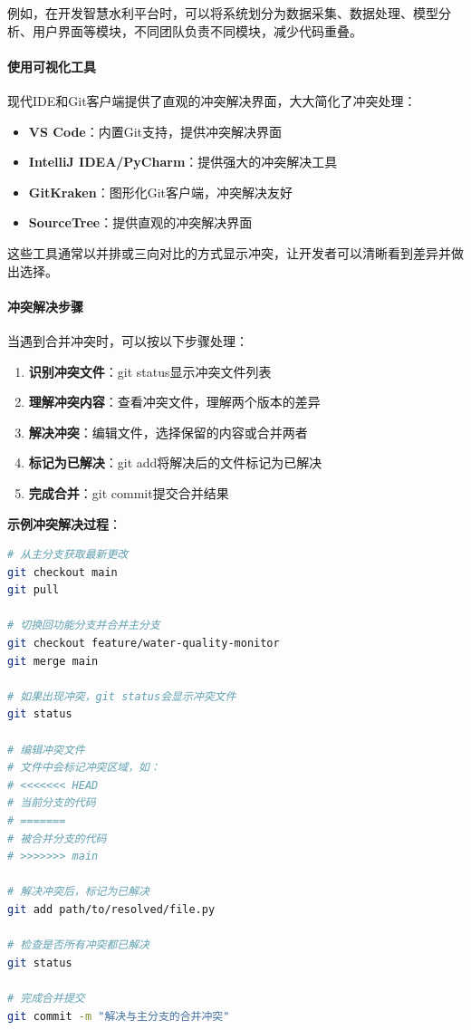 例如，在开发智慧水利平台时，可以将系统划分为数据采集、数据处理、模型分析、用户界面等模块，不同团队负责不同模块，减少代码重叠。

\paragraph{使用可视化工具}\label{ux4f7fux7528ux53efux89c6ux5316ux5de5ux5177}

现代IDE和Git客户端提供了直观的冲突解决界面，大大简化了冲突处理：

\begin{itemize}
\tightlist
\item
  \textbf{VS Code}：内置Git支持，提供冲突解决界面
\item
  \textbf{IntelliJ IDEA/PyCharm}：提供强大的冲突解决工具
\item
  \textbf{GitKraken}：图形化Git客户端，冲突解决友好
\item
  \textbf{SourceTree}：提供直观的冲突解决界面
\end{itemize}

这些工具通常以并排或三向对比的方式显示冲突，让开发者可以清晰看到差异并做出选择。

\paragraph{冲突解决步骤}\label{ux51b2ux7a81ux89e3ux51b3ux6b65ux9aa4}

当遇到合并冲突时，可以按以下步骤处理：

\begin{enumerate}
\def\labelenumi{\arabic{enumi}.}
\tightlist
\item
  \textbf{识别冲突文件}：git status显示冲突文件列表
\item
  \textbf{理解冲突内容}：查看冲突文件，理解两个版本的差异
\item
  \textbf{解决冲突}：编辑文件，选择保留的内容或合并两者
\item
  \textbf{标记为已解决}：git add将解决后的文件标记为已解决
\item
  \textbf{完成合并}：git commit提交合并结果
\end{enumerate}

\textbf{示例冲突解决过程}：

\begin{lstlisting}[language=bash]
# 从主分支获取最新更改
git checkout main
git pull

# 切换回功能分支并合并主分支
git checkout feature/water-quality-monitor
git merge main

# 如果出现冲突，git status会显示冲突文件
git status

# 编辑冲突文件
# 文件中会标记冲突区域，如：
# <<<<<<< HEAD
# 当前分支的代码
# =======
# 被合并分支的代码
# >>>>>>> main

# 解决冲突后，标记为已解决
git add path/to/resolved/file.py

# 检查是否所有冲突都已解决
git status

# 完成合并提交
git commit -m "解决与主分支的合并冲突"
\end{lstlisting}

